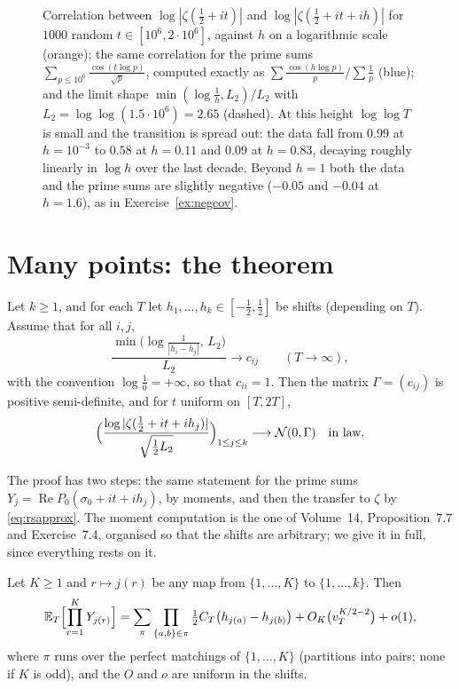 \begin{figure}[ht]\centering{}
\caption{Correlation between $\log|\zeta(\frac12+it)|$ and $\log|\zeta(\frac12+it+ih)|$ for $1000$ random $t\in[10^6,2\cdot10^6]$, against $h$ on a logarithmic scale (orange); the same correlation for the prime sums $\sum_{p\le10^6}\frac{\cos(t\log p)}{\sqrt p}$, computed exactly as $\sum\frac{\cos(h\log p)}p/\sum\frac1p$ (blue); and the limit shape $\min(\log\frac1h,L_2)/L_2$ with $L_2=\log\log(1.5\cdot10^6)=2.65$ (dashed). At this height $\log\log T$ is small and the transition is spread out: the data fall from $0.99$ at $h=10^{-3}$ to $0.58$ at $h=0.11$ and $0.09$ at $h=0.83$, decaying roughly linearly in $\log h$ over the last decade. Beyond $h=1$ both the data and the prime sums are slightly negative ($-0.05$ and $-0.04$ at $h=1.6$), as in Exercise~\ref{ex:negcov}.}
\label{fig:correlation}
\end{figure}

\section{Many points: the theorem}

\begin{theorem}\label{thm:multipoint}
Let $k\ge1$, and for each $T$ let $h_1,\dots,h_k\in[-\frac12,\frac12]$ be shifts (depending on $T$). Assume that for all $i,j$,
\[
\frac{\min\bigl(\log\frac1{|h_i-h_j|},\,L_2\bigr)}{L_2}\longrightarrow c_{ij}\qquad(T\to\infty),
\]
with the convention $\log\frac10=+\infty$, so that $c_{ii}=1$. Then the matrix $\Gamma=(c_{ij})$ is positive semi-definite, and for $t$ uniform on $[T,2T]$,
\[
\Bigl(\frac{\log|\zeta(\frac12+it+ih_j)|}{\sqrt{\frac12L_2}}\Bigr)_{1\le j\le k}\longrightarrow\mathcal N(0,\Gamma)\quad\text{in law}.
\]
\end{theorem}

The proof has two steps: the same statement for the prime sums $Y_j=\operatorname{Re}P_0(\sigma_0+it+ih_j)$, by moments, and then the transfer to $\zeta$ by \eqref{eq:rsapprox}. The moment computation is the one of Volume~14, Proposition~7.7 and Exercise~7.4, organised so that the shifts are arbitrary; we give it in full, since everything rests on it.

\begin{lemma}\label{lem:jointmoments}
Let $K\ge1$ and $r\mapsto j(r)$ be any map from $\{1,\dots,K\}$ to $\{1,\dots,k\}$. Then
\[
\mathbb E_T\Bigl[\prod_{r=1}^KY_{j(r)}\Bigr]=\sum_{\pi}\prod_{\{a,b\}\in\pi}\tfrac12C_T\bigl(h_{j(a)}-h_{j(b)}\bigr)+O_K\bigl(v_T^{K/2-2}\bigr)+o(1),
\]
where $\pi$ runs over the perfect matchings of $\{1,\dots,K\}$ (partitions into pairs; none if $K$ is odd), and the $O$ and $o$ are uniform in the shifts.
\end{lemma}

